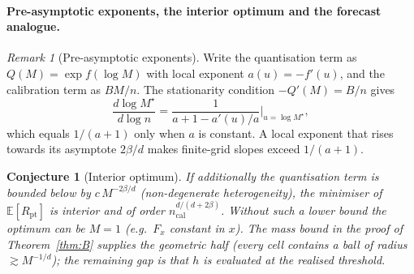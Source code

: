 \documentclass[twoside]{article}
\newtheorem{conjecture}[theorem]{Conjecture}
\theoremstyle{definition}
\theoremstyle{remark}
\newtheorem{remark}[theorem]{Remark}
\newcommand{\E}{\mathbb{E}}
\newcommand{\1}{\mathbf{1}}
\begin{document}
\paragraph{Pre-asymptotic exponents, the interior optimum and the forecast analogue.}
\begin{remark}[Pre-asymptotic exponents]
\label{rem:drift}
Write the quantisation term as $Q(M)=\exp f(\log M)$ with local exponent $a(u)=-f'(u)$, and
the calibration term as $BM/n$. The stationarity condition $-Q'(M)=B/n$ gives
\[
  \frac{d\log M^\star}{d\log n} = \frac{1}{a+1-a'(u)/a}\Big|_{u=\log M^\star},
\]
which equals $1/(a+1)$ only when $a$ is constant. A local exponent that rises towards its
asymptote $2\beta/d$ makes finite-grid slopes exceed $1/(a+1)$.
\end{remark}

\begin{conjecture}[Interior optimum]
\label{conj:B}
If additionally the quantisation term is bounded \emph{below} by $c\,M^{-2\beta/d}$
(non-degenerate heterogeneity), the minimiser of $\E[R_{\mathrm{pt}}]$ is interior and of
order $n_{\mathrm{cal}}^{d/(d+2\beta)}$. Without such a lower bound the optimum can be $M=1$
(e.g.\ $F_x$ constant in $x$). The mass bound in the proof of Theorem~\ref{thm:B} supplies the
geometric half (every cell contains a ball of radius $\gtrsim M^{-1/d}$); the remaining gap is
that $h$ is evaluated at the realised threshold.
\end{conjecture}
\end{document}
